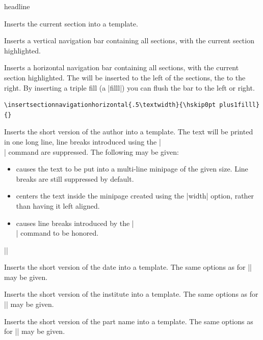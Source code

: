 \begin{element}{headline}
\begin{itemize}
    \iteminsert{\insertsection}
    Inserts the current section into a template.

    \iteminsert{\insertsectionnavigation}
    Inserts a vertical navigation bar containing all sections, with the current section highlighted.

    \iteminsert{\insertsectionnavigationhorizontal}
    Inserts a horizontal navigation bar containing all sections, with the current section highlighted. The  will be inserted to the left of the sections, the  to the right. By inserting a triple fill (a |filll|) you can flush the bar to the left or right.
    \example
\begin{verbatim}
\insertsectionnavigationhorizontal{.5\textwidth}{\hskip0pt plus1filll}{}
\end{verbatim}

    \iteminsert{\insertshortauthor}
    Inserts the short version of the author into a template. The text will be printed in one long line, line breaks introduced using the |\\| command are suppressed. The following  may be given:
    \begin{itemize}
      \item
      causes the text to be put into a multi-line minipage of the given size. Line breaks are still suppressed by default.
      \item
      centers the text inside the minipage created using the |width| option, rather than having it left aligned.
      \item
      causes line breaks introduced by the |\\| command to be honored.
    \end{itemize}

    \example
    |\insertauthor[width={3cm},center,respectlinebreaks]|

    \iteminsert{\insertshortdate}
    Inserts the short version of the date into a template. The same options as for |\insertshortauthor| may be given.

    \iteminsert{\insertshortinstitute}
    Inserts the short version of the institute into a template. The same options as for |\insertshortauthor| may be given.

    \iteminsert{\insertshortpart}
    Inserts the short version of the part name into a template. The same options as for |\insertshortauthor| may be given.


\end{itemize}
\end{element}
